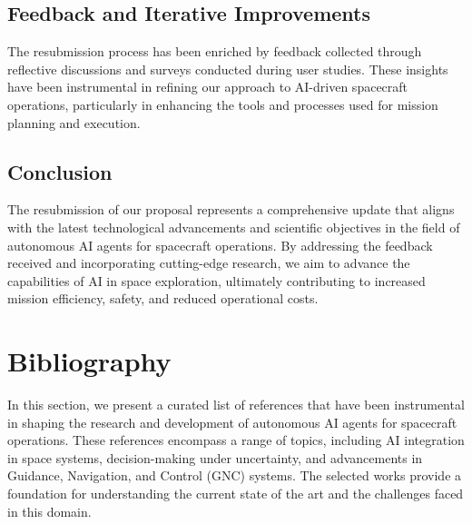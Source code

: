 \documentclass[a4paper,12pt]{article}
\begin{document}
\subsection{Feedback and Iterative Improvements}

The resubmission process has been enriched by feedback collected through reflective discussions and surveys conducted during user studies. These insights have been instrumental in refining our approach to AI-driven spacecraft operations, particularly in enhancing the tools and processes used for mission planning and execution.

\subsection{Conclusion}

The resubmission of our proposal represents a comprehensive update that aligns with the latest technological advancements and scientific objectives in the field of autonomous AI agents for spacecraft operations. By addressing the feedback received and incorporating cutting-edge research, we aim to advance the capabilities of AI in space exploration, ultimately contributing to increased mission efficiency, safety, and reduced operational costs.



\section{Bibliography}

In this section, we present a curated list of references that have been instrumental in shaping the research and development of autonomous AI agents for spacecraft operations. These references encompass a range of topics, including AI integration in space systems, decision-making under uncertainty, and advancements in Guidance, Navigation, and Control (GNC) systems. The selected works provide a foundation for understanding the current state of the art and the challenges faced in this domain.
\end{document}

